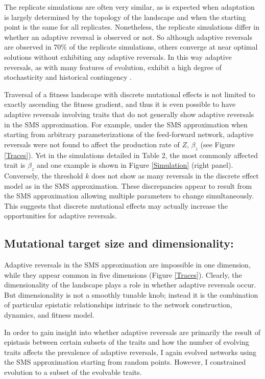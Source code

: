 \documentclass[dvips,12pt,twoside,titlepage]{article}
\begin{document}
The replicate simulations are often very similar, as is expected when adaptation is largely determined by the topology of the landscape and when the starting point is the same for all replicates. 
Nonetheless, the replicate simulations differ in whether an adaptive reversal is observed or not.
So although adaptive reversals are observed in 70\% of the replicate simulations, others converge at near optimal solutions without exhibiting any adaptive reversals.
In this way adaptive reversals, as with many features of evolution, exhibit a high degree of stochasticity and historical contingency \cite{Lenormand:2009p1455,Bullaughey:2011cf,Salverda:2011fa}.

Traversal of a fitness landscape with discrete mutational effects is not limited to exactly ascending the fitness gradient, and thus it is even possible to have adaptive reversals involving traits that do not generally show adaptive reversals in the SMS approximation. 
For example, under the SMS approximation when starting from arbitrary parameterizations of the feed-forward network, adaptive reversals were not found to affect the production rate of $Z$, $\beta_z$ (see Figure \ref{Traces}). 
Yet in the simulations detailed in Table 2, the most commonly affected trait is $\beta_z$ and one example is shown in Figure \ref{Simulation} (right panel).
Conversely, the threshold $k$ does not show as many reversals in the discrete effect model as in the SMS approximation.
These discrepancies appear to result from the SMS approximation allowing multiple parameters to change simultaneously.
This suggests that discrete mutational effects may actually increase the opportunities for adaptive reversals.

\subsection*{Mutational target size and dimensionality:}

Adaptive reversals in the SMS approximation are impossible in one dimension, while they appear common in five dimensions (Figure \ref{Traces}). 
Clearly, the dimensionality of the landscape plays a role in whether adaptive reversals occur.
But dimensionality is not a smoothly tunable knob; instead it is the combination of particular epistatic relationships intrinsic to the network construction, dynamics, and fitness model.

In order to gain insight into whether adaptive reversals are primarily the result of epistasis between certain subsets of the traits and how the number of evolving traits affects the prevalence of adaptive reversals, I again evolved networks using the SMS approximation starting from random points. However, I constrained evolution to a subset of the evolvable traits.
\end{document}
